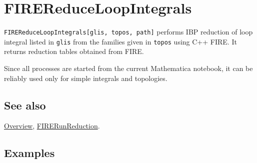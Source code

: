 \documentclass[../FeynHelpersManual.tex]{subfiles}
\begin{document}
\hypertarget{firereduceloopintegrals}{
\section{FIREReduceLoopIntegrals}\label{firereduceloopintegrals}}

\texttt{FIREReduceLoopIntegrals[\allowbreak{}glis,\ \allowbreak{}topos,\ \allowbreak{}path]}
performs IBP reduction of loop integral listed in \texttt{glis} from the
families given in \texttt{topos} using C++ FIRE. It returns reduction
tables obtained from FIRE.

Since all processes are started from the current Mathematica notebook,
it can be reliably used only for simple integrals and topologies.

\subsection{See also}

\hyperlink{toc}{Overview},
\hyperlink{firerunreduction}{FIRERunReduction}.

\subsection{Examples}

\begin{Shaded}
\begin{Highlighting}[]
\ExtensionTok{=} \OperatorTok{[}\OperatorTok{[\{}\OperatorTok{,} \OperatorTok{,} \OperatorTok{,} \OperatorTok{,} \OperatorTok{\}]]}\NormalTok{;}
\end{Highlighting}
\end{Shaded}

\begin{Shaded}
\begin{Highlighting}[]
\SpecialCharTok{//} 

\end{Highlighting}
\end{Shaded}

\begin{Shaded}
\begin{Highlighting}[]
\OperatorTok{[[}\NormalTok{ ;; }\OperatorTok{]]}

\end{Highlighting}
\end{Shaded}
\end{document}
